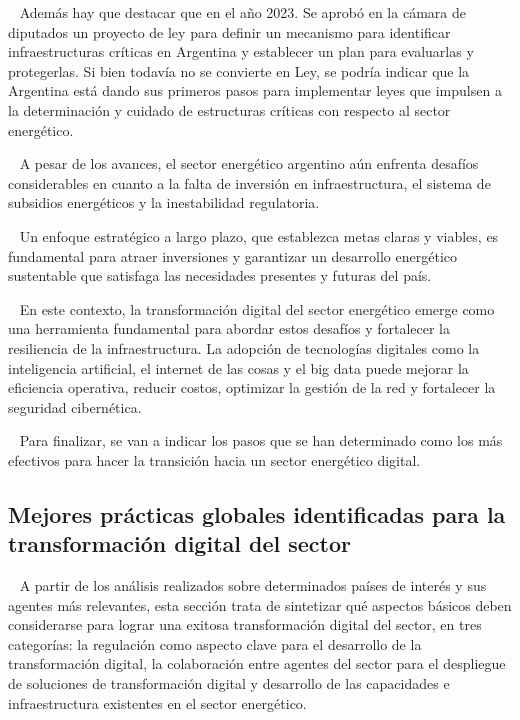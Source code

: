 \documentclass{article}
\begin{document}
~ Además hay que destacar que en el año 2023. Se aprobó en la cámara de
diputados un proyecto de ley para definir un mecanismo para identificar
infraestructuras críticas en Argentina y establecer un plan para
evaluarlas y protegerlas. Si bien todavía no se convierte en Ley, se
podría indicar que la Argentina está dando sus primeros pasos para
implementar leyes que impulsen a la determinación y cuidado de
estructuras críticas con respecto al sector energético.

~ A pesar de los avances, el sector energético argentino aún enfrenta
desafíos considerables en cuanto a la falta de inversión en
infraestructura, el sistema de subsidios energéticos y la inestabilidad
regulatoria.

~ Un enfoque estratégico a largo plazo, que establezca metas claras y
viables, es fundamental para atraer inversiones y garantizar un
desarrollo energético sustentable que satisfaga las necesidades
presentes y futuras del país.

~ En este contexto, la transformación digital del sector energético
emerge como una herramienta fundamental para abordar estos desafíos y
fortalecer la resiliencia de la infraestructura. La adopción de
tecnologías digitales como la inteligencia artificial, el internet de
las cosas y el big data puede mejorar la eficiencia operativa, reducir
costos, optimizar la gestión de la red y fortalecer la seguridad
cibernética.

~ Para finalizar, se van a indicar los pasos que se han determinado como
los más efectivos para hacer la transición hacia un sector energético
digital.

\hypertarget{mejores-pruxe1cticas-globales-identificadas-para-la-transformaciuxf3n-digital-del-sector}{%
\subsection{Mejores prácticas globales identificadas para la
transformación digital del
sector}\label{mejores-pruxe1cticas-globales-identificadas-para-la-transformaciuxf3n-digital-del-sector}}

~ A partir de los análisis realizados sobre determinados países de
interés y sus agentes más relevantes, esta sección trata de sintetizar
qué aspectos básicos deben considerarse para lograr una exitosa
transformación digital del sector, en tres categorías: la regulación
como aspecto clave para el desarrollo de la transformación digital, la
colaboración entre agentes del sector para el despliegue de soluciones
de transformación digital y desarrollo de las capacidades e
infraestructura existentes en el sector energético.
\end{document}
